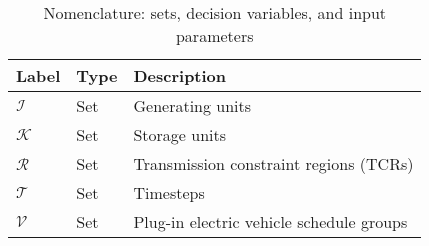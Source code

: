\documentclass[9pt,twoside,lineno]{pnas-new}
\begin{document}
\begin{table}[!ht]
  \begin{center}
    \caption{Nomenclature: sets, decision variables, and input parameters}
    \label{tab:notation}
   \scriptsize
    \begin{tabular}{lll}
      Label & Type & Description \\
      \hline
      $\mathcal{I}$ & Set & Generating units\\
      $\mathcal{K}$ & Set & Storage units \\
      $\mathcal{R}$ & Set & Transmission constraint regions (TCRs)\\
      $\mathcal{T}$ & Set & Timesteps\\
      $\mathcal{V}$ & Set & Plug-in electric vehicle schedule groups\\
      \hline
     

\end{tabular}
\end{center}
\end{table}
\end{document}
